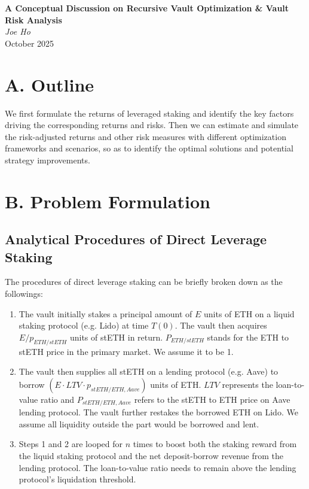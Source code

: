 \documentclass[11pt, a4paper]{article}
\begin{document}
\begin{center}
    \Large\textbf{A Conceptual Discussion on Recursive Vault Optimization \& Vault Risk Analysis} \\
    \vspace{0.2cm}
    \large \textit{Joe Ho} \\
    \vspace{0.1cm}
    \normalsize October 2025
\end{center}
\vspace{0.5cm}

\section*{A. Outline}
We first formulate the returns of leveraged staking and identify the key factors driving the corresponding returns and risks. Then we can estimate and simulate the risk-adjusted returns and other risk measures with different optimization frameworks and scenarios, so as to identify the optimal solutions and potential strategy improvements.

\section*{B. Problem Formulation}

\subsection*{Analytical Procedures of Direct Leverage Staking}
The procedures of direct leverage staking can be briefly broken down as the followings:

\begin{enumerate}
    \item The vault initially stakes a principal amount of $E$ units of ETH on a liquid staking protocol (e.g. Lido) at time $T(0)$. The vault then acquires $E/p_{ETH/stETH}$ units of stETH in return. $P_{ETH/stETH}$ stands for the ETH to stETH price in the primary market. We assume it to be 1.
    \item The vault then supplies all stETH on a lending protocol (e.g. Aave) to borrow $(E \cdot LTV \cdot p_{stETH/ETH,Aave})$ units of ETH. $LTV$ represents the loan-to-value ratio and $P_{stETH/ETH,Aave}$ refers to the stETH to ETH price on Aave lending protocol. The vault further restakes the borrowed ETH on Lido. We assume all liquidity outside the part would be borrowed and lent.
    \item Steps 1 and 2 are looped for $n$ times to boost both the staking reward from the liquid staking protocol and the net deposit-borrow revenue from the lending protocol. The loan-to-value ratio needs to remain above the lending protocol's liquidation threshold.
\end{enumerate}
\end{document}
